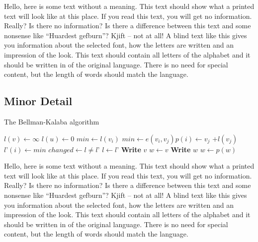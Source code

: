 \documentclass[%
  english,%
  todotools=true,%
  trtype=singlearticle%
]{hpitr}
\begin{document}
Hello, here is some text without a meaning. This text should show
what a printed text will look like at this place. If you read this
text, you will get no information. Really? Is there no information?
Is there a difference between this text and some nonsense like
“Huardest gefburn”? Kjift – not at all! A blind text like this gives
you information about the selected font, how the letters are written
and an impression of the look. This text should contain all letters
of the alphabet and it should be written in of the original
language. There is no need for special content, but the length of
words should match the language.


\subsection{Minor Detail}
\label{sec:detail}

\begin{algorithm}
\caption{The Bellman-Kalaba algorithm}
\begin{algorithmic}[1]
\State $l(v) \leftarrow \infty$
\EndFor
\State $l(u) \leftarrow 0$
\Repeat
{}
\State $min \leftarrow l(v_i)$
\State $min \leftarrow e(v_i, v_j)$\State $p(i) \leftarrow v_j$
\EndIf
$+l(v_j)$
\EndFor
\State $l’(i) \leftarrow min$
\EndFor
\State $changed \leftarrow l \not= l’$
\State $l \leftarrow l’$
\EndProcedure
\Statex
{}
\State \textbf{Write} $v$
\Else
\State $w \leftarrow v$
\State \textbf{Write} $w$
\State $w \leftarrow p(w)$
\EndWhile
\EndIf
\EndProcedure
\end{algorithmic}
\end{algorithm}

Hello, here is some text without a meaning. This text should show
what a printed text will look like at this place. If you read this
text, you will get no information. Really? Is there no information?
Is there a difference between this text and some nonsense like
“Huardest gefburn”? Kjift – not at all! A blind text like this gives
you information about the selected font, how the letters are written
and an impression of the look. This text should contain all letters
of the alphabet and it should be written in of the original
language. There is no need for special content, but the length of
words should match the language.
\end{document}
